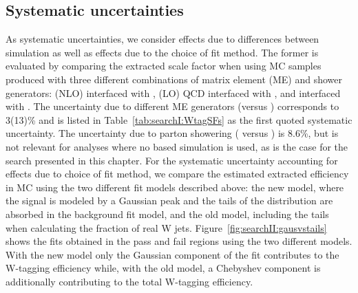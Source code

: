 \subsection{Systematic uncertainties}
\label{sec:searchI:wtagsystematic}
As systematic uncertainties, we consider effects due to differences between \ttbar simulation as well as effects due to the choice of fit method. The former is evaluated by comparing the extracted scale factor when using \ttbar MC samples produced with three different combinations of matrix element (ME) and shower generators: \POWHEG (NLO) interfaced with  , \MADGRAPH (LO) QCD interfaced with \HERWIG{++}, and \POWHEG interfaced with \HERWIG{++}. The uncertainty due to different ME generators (\POWHEG versus \MADGRAPH) corresponds to 3(13)\% and is listed in Table~\ref{tab:searchI:WtagSFs} as the first quoted systematic uncertainty. The uncertainty due to parton showering ( versus \HERWIG{++}) is 8.6\%, but is not relevant for analyses where no \HERWIG{++} based simulation is used, as is the case for the search presented in this chapter. 
For the systematic uncertainty accounting for effects due to choice of fit method, we compare the estimated extracted efficiency in \ttbar MC using the two different fit models described above: the new model, where the signal is modeled by a Gaussian peak and the tails of the distribution are absorbed in the background fit model, and the old model, including the tails when calculating the fraction of real W jets. Figure~\ref{fig:searchII:gausvstails} shows the fits obtained in the pass and fail regions using the two different models. With the new model only the Gaussian component of the fit contributes to the W-tagging efficiency while, with the old model, a Chebyshev component is additionally contributing to the total W-tagging efficiency.
